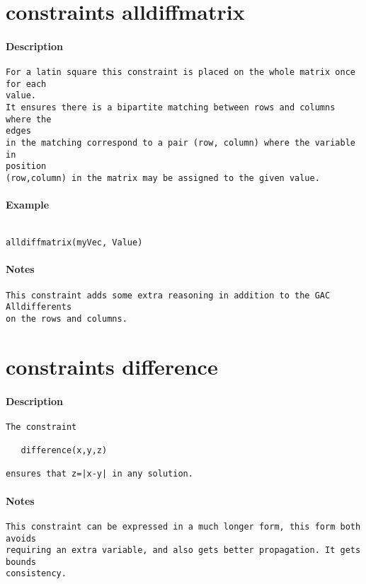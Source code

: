 \section{constraints alldiffmatrix}
\paragraph{Description}
{\footnotesize
\begin{verbatim}
For a latin square this constraint is placed on the whole matrix once for each
value.
It ensures there is a bipartite matching between rows and columns where the
edges
in the matching correspond to a pair (row, column) where the variable in
position
(row,column) in the matrix may be assigned to the given value.
\end{verbatim}
}
\paragraph{Example}
{\footnotesize
\begin{verbatim}

alldiffmatrix(myVec, Value)
\end{verbatim}
}
\paragraph{Notes}
{\footnotesize
\begin{verbatim}
This constraint adds some extra reasoning in addition to the GAC Alldifferents
on the rows and columns.
\end{verbatim}
}
\section{constraints difference}
\paragraph{Description}
{\footnotesize
\begin{verbatim}
The constraint

   difference(x,y,z)

ensures that z=|x-y| in any solution.
\end{verbatim}
}
\paragraph{Notes}
{\footnotesize
\begin{verbatim}
This constraint can be expressed in a much longer form, this form both avoids
requiring an extra variable, and also gets better propagation. It gets bounds
consistency.
\end{verbatim}
}
